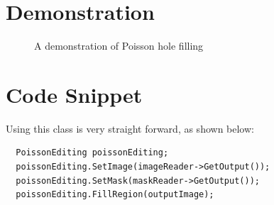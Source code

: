 \documentclass{InsightArticle}
\begin{document}
\section{Demonstration}

\begin{figure}[H]
\centering
{}
\caption{A demonstration of Poisson hole filling}
\label{fig:Demonstration}
\end{figure}
\section{Code Snippet}

Using this class is very straight forward, as shown below:

\begin{verbatim}
  PoissonEditing poissonEditing;
  poissonEditing.SetImage(imageReader->GetOutput());
  poissonEditing.SetMask(maskReader->GetOutput());
  poissonEditing.FillRegion(outputImage);
\end{verbatim}
\end{document}
